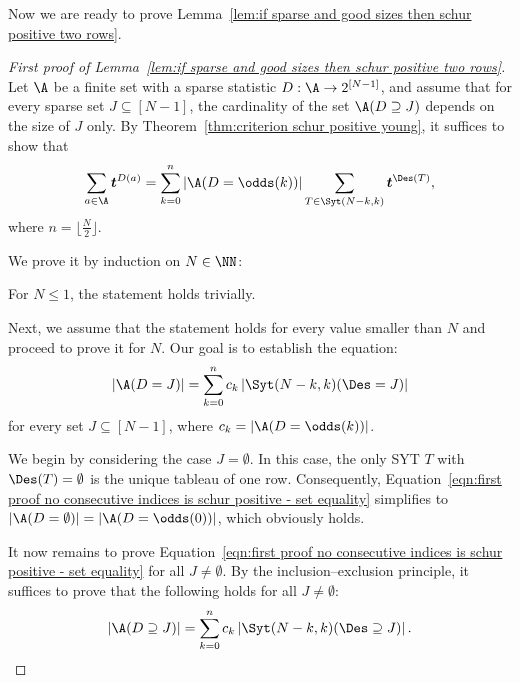 Now we are ready to prove Lemma~\ref{lem:if sparse and good sizes then schur positive two rows}.
\begin{proof}[First proof of Lemma~\ref{lem:if sparse and good sizes then schur positive two rows}]
    Let $\A$ be a finite set with a sparse statistic $D:\A \to 2^{[N-1]}$, and assume that for every sparse set $J \subseteq [N-1]$, the cardinality of the set $\A(D \supseteq J)$ depends on the size of $J$ only.
    By Theorem~\ref{thm:criterion schur positive young}, it suffices to show that
    \begin{equation}\label{eqn:first proof no consecutive indices is schur positive - generating function}
        \sum_{a \in \A} \boldsymbol{t}^{D(a)} = \sum_{k=0}^n |\A(D=\odds(k))| \sum_{T \in \Syt(N-k,k)} \boldsymbol{t}^{\Des(T)},
    \end{equation}
    where $n = \lfloor\frac{N}{2}\rfloor$.
    
    We prove it by induction on $N \in \NN$:
    
    For $N \le 1$, the statement holds trivially.
    
    Next, we assume that the statement holds for every value smaller than $N$ and proceed to prove it for $N$. Our goal is to establish the equation:
    \begin{equation}\label{eqn:first proof no consecutive indices is schur positive - set equality}
        \left|\A(D=J)\right| = \sum_{k=0}^n c_k \left|\Syt(N-k,k)(\Des=J)\right|
    \end{equation}
    for every set $J \subseteq [N-1]$, where $c_k = \left|\A(D=\odds(k))\right|$.
    
    We begin by considering the case $J = \emptyset$. In this case, the only SYT $T$ with $\Des(T) = \emptyset$ is the unique tableau of one row. Consequently, Equation~\eqref{eqn:first proof no consecutive indices is schur positive - set equality} simplifies to $\left|\A(D=\emptyset)\right| = \left|\A(D=\odds(0))\right|$, which obviously holds.
    
    It now remains to prove Equation~\eqref{eqn:first proof no consecutive indices is schur positive - set equality} for all $J \ne \emptyset$. By  the inclusion--exclusion principle, it suffices to prove that the following holds for all $J \ne \emptyset$:
    \begin{equation}\label{eqn:first proof no consecutive indices is schur positive - set containment}
        \left|\A(D \supseteq J)\right| = \sum_{k=0}^n c_k \left|\Syt(N-k,k)(\Des \supseteq J)\right|.
    \end{equation}
    

\end{proof}
